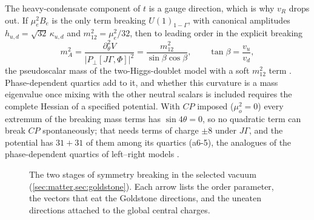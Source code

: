 The heavy-condensate component of $t$ is a gauge direction, which is why $v_R$ drops out. If $\mu_e^2B_e$ is the only term breaking $U(1)_{1-\Gamma}$, with canonical
amplitudes $h_{u,d}=\sqrt{32}\,\kappa_{u,d}$ and $m_{12}^2=\mu_e^2/32$, then to leading order in the explicit breaking
\[
m_A^2=\frac{\partial_\theta^2V}{|P_\perp[J\Gamma,\Phi]|^2}=\frac{m_{12}^2}{\sin\beta\cos\beta},\qquad \tan\beta=\frac{v_u}{v_d},
\]
the pseudoscalar mass of the two-Higgs-doublet model with a soft $m_{12}^2$ term \cite{Branco12}. Phase-dependent quartics add to it, and whether this curvature
is a mass eigenvalue once mixing with the other neutral scalars is included requires the complete Hessian of a specified potential. With $CP$ imposed
($\mu_o^2=0$) every extremum of the breaking mass terms has $\sin4\theta=0$, so no quadratic term can break $CP$ spontaneously; that needs terms of charge $\pm8$
under $J\Gamma$, and the potential has $31+31$ of them among its quartics (a6-5), the analogues of the phase-dependent quartics of left--right models \cite{DGKO91}.

\begin{figure}[t]
\centering
{}
\caption{The two stages of symmetry breaking in the selected vacuum (\cref{sec:matter,sec:goldstone}). Each arrow lists the order parameter, the vectors that
eat the Goldstone directions, and the uneaten directions attached to the global central charges.}
\label{fig:breaking}
\end{figure}

